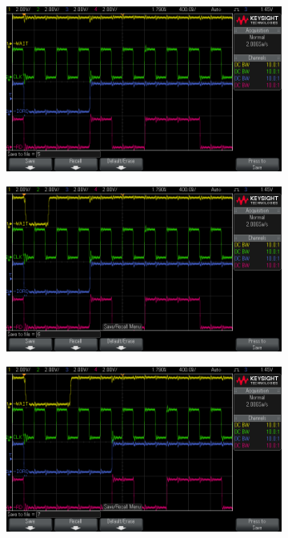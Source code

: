 \documentclass[fleqn]{article}
\begin{document}
\begin{figure}[H]
	\centering
	\begin{subfigure}[b]{0.49\textwidth}
		\includegraphics[width=\textwidth]{img/2a.png}
		\caption{}
	\end{subfigure}
	\begin{subfigure}[b]{0.49\textwidth}
		\includegraphics[width=\textwidth]{img/2b.png}
		\caption{}
	\end{subfigure}
	\begin{subfigure}[b]{0.49\textwidth}
		\includegraphics[width=\textwidth]{img/2c.png}

\end{subfigure}
\end{figure}
\end{document}
